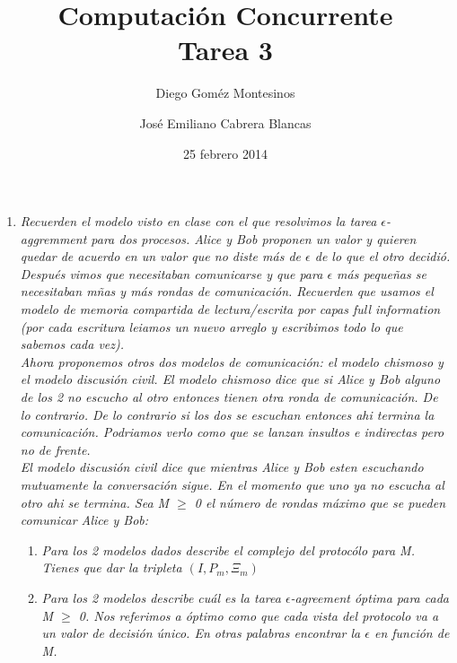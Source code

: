 \documentclass{article}
\title{Computación Concurrente \\ \Large{Tarea 3}}
\author{
  Diego Goméz Montesinos
  \and
  José Emiliano Cabrera Blancas
  }
\date{25 febrero 2014}
\begin{document}
\maketitle
\begin{enumerate}
\item{
    \textsl{
    Recuerden el modelo visto en clase con el que resolvimos la tarea
    $\epsilon$-aggremment para dos procesos. Alice y Bob proponen un valor y
    quieren quedar de acuerdo en un valor que no diste más de $\epsilon$ de lo
    que el otro decidió. Después vimos que necesitaban comunicarse y que para 
    $\epsilon$ más pequeñas se necesitaban mñas y más rondas de comunicación.
    Recuerden que usamos el modelo de memoria compartida de lectura/escrita por
    capas \textit{full information} (por cada escritura leiamos un nuevo
    arreglo y escribimos todo lo que sabemos cada vez).\\
    Ahora proponemos otros dos modelos de comunicación: el modelo chismoso y el
    modelo discusión civil. El modelo chismoso dice que si Alice y Bob alguno de
    los 2 no escucho al otro entonces tienen otra ronda de comunicación. De lo 
    contrario. De lo contrario si los dos se escuchan entonces ahi termina la 
    comunicación. Podriamos verlo como que se lanzan insultos e indirectas pero
    no de frente.\\
    El modelo discusión civil dice que mientras Alice y Bob esten escuchando 
    mutuamente la conversación sigue. En el momento que uno ya no escucha al otro
    ahi se termina.
    Sea \textit{M} $≥$ 0 el número de rondas máximo que se pueden comunicar Alice
    y Bob:}
      

    \begin{enumerate}
      \item{\textsl{Para los 2 modelos dados describe el complejo del protocólo para M. 
        Tienes que dar la tripleta $(I,P_m,\Xi_m)$}}

      \item{\textsl{Para los 2 modelos describe cuál es la tarea $\epsilon$-agreement
        óptima para cada \textit{M} $≥$ 0. Nos referimos a óptimo como que cada
        vista del protocolo va a un valor de decisión único. En otras palabras
      encontrar la $\epsilon$ en función de M.}}
    \end{enumerate}
  }


\end{enumerate}
\end{document}

